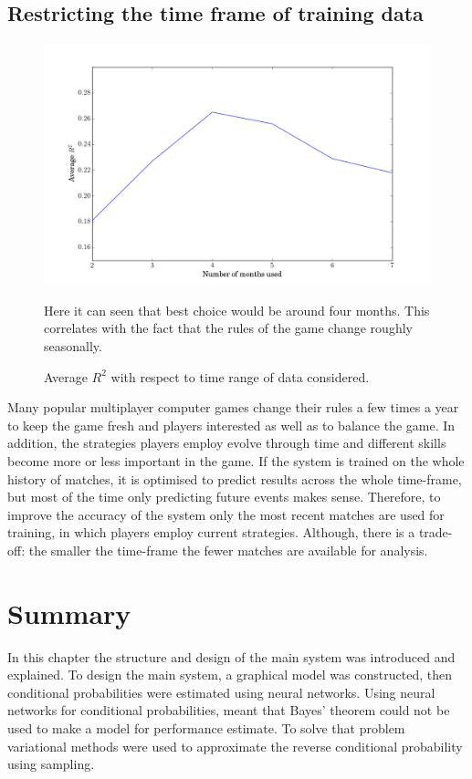 \documentclass[12pt,a4paper]{book}
\newcommand\note[1]{\vspace*{-0.5\baselineskip}\caption*{#1}}
\begin{document}
\subsection{Restricting the time frame of training data}
\begin{figure}[ht]
\centering
\includegraphics[scale=0.5]{time-variance}
\caption{Average $R^2$ with respect to time range of data considered.}
\note{Here it can seen that best choice would be around four months.
This correlates with the fact that the rules of the game change roughly seasonally.}
\label{fig:time-variance}
\end{figure}
Many popular multiplayer computer games change their rules a few times a year to keep the game fresh and players interested as well as to balance the game.
In addition, the strategies players employ evolve through time and different skills become more or less important in the game.
If the system is trained on the whole history of matches, it is optimised to predict results across the whole time-frame, but most of the time only predicting future events makes sense.
Therefore, to improve the accuracy of the system only the most recent matches are used for training, in which players employ current strategies.
Although, there is a trade-off: the smaller the time-frame the fewer matches are available for analysis.

\section{Summary}
In this chapter the structure and design of the main system was introduced and explained.
To design the main system, a graphical model was constructed, then conditional probabilities were estimated using neural networks.
Using neural networks for conditional probabilities, meant that Bayes' theorem could not be used to make a model for performance estimate.
To solve that problem variational methods were used to approximate the reverse conditional probability using sampling.
\end{document}
